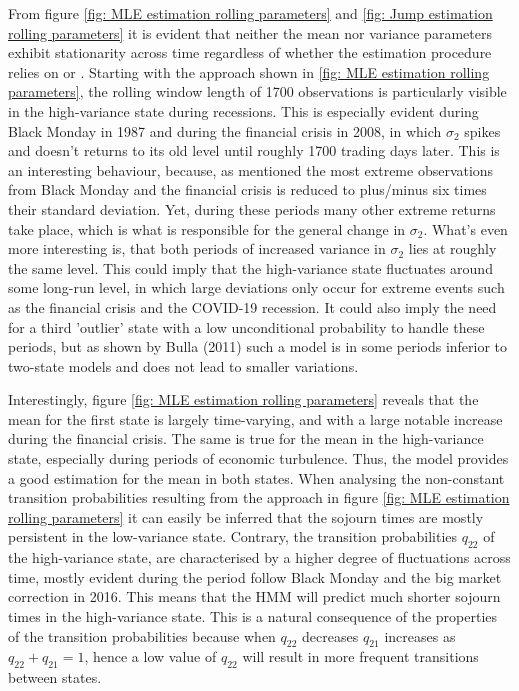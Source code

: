 From figure \ref{fig: MLE estimation rolling parameters} and \ref{fig: Jump estimation rolling parameters} it is evident that neither the mean nor variance parameters exhibit stationarity across time regardless of whether the estimation procedure relies on \mle or \jump. Starting with the \mle approach shown in \cref{fig: MLE estimation rolling parameters}, the rolling window length of 1700 observations is particularly visible in the high-variance state during recessions. This is especially evident during Black Monday in 1987 and during the financial crisis in 2008, in which $\sigma_2$ spikes and doesn't returns to its old level until roughly 1700 trading days later. This is an interesting behaviour, because, as mentioned the most extreme observations from Black Monday and the financial crisis is reduced to plus/minus six times their standard deviation. Yet, during these periods many other extreme returns take place, which is what is responsible for the general change in $\sigma_2$. What's even more interesting is, that both periods of increased variance in $\sigma_2$ lies at roughly the same level. This could imply that the high-variance state fluctuates around some long-run level, in which large deviations only occur for extreme events such as the financial crisis and the COVID-19 recession. It could also imply the need for a third 'outlier' state with a low unconditional probability to handle these periods, but as shown by Bulla (2011) such a model is in some periods inferior to two-state models and does not lead to smaller variations.

Interestingly, figure \ref{fig: MLE estimation rolling parameters} reveals that the mean for the first state is largely time-varying, and with a large notable increase during the financial crisis. The same is true for the mean in the high-variance state, especially during periods of economic turbulence. Thus, the model provides a good estimation for the mean in both states. When analysing the non-constant transition probabilities resulting from the \mle approach in figure \ref{fig: MLE estimation rolling parameters} it can easily be inferred that the sojourn times are mostly persistent in the low-variance state. Contrary, the transition probabilities $q_{22}$ of the high-variance state, are characterised by a higher degree of fluctuations across time, mostly evident during the period follow Black Monday and the big market correction in 2016. This means that the HMM will predict much shorter sojourn times in the high-variance state. This is a natural consequence of the properties of the transition probabilities because when $q_{22}$ decreases $q_{21}$ increases as $q_{22} + q_{21} = 1$, hence a low value of $q_{22}$ will result in more frequent transitions between states.

